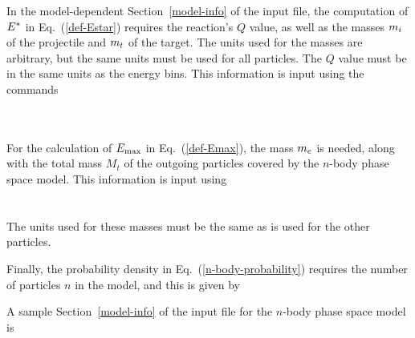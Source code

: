 In the model-dependent Section~\ref{model-info} of the input file,
the computation of ${E^*}$ in Eq.~(\ref{def-Estar}) requires the
reaction's $Q$ value, as well as the masses $m_i$ of the projectile
and $m_t$ of the target.  The units used for the masses are arbitrary,
but the same units must be used for all particles.  The $Q$ value must be
in the same units as the energy bins.  This information is input using
the commands\\
  \\
   \\
 
For the calculation of $E_{\text{max}}$ in Eq.~(\ref{def-Emax}), the mass $m_e$
is needed, along with the total mass $M_t$ of the outgoing particles covered
by the $n$-body phase space model.  This information is input using\\
  \\
 \\
The units used for these masses must be the
same as is used for the other particles.

Finally, the probability density in Eq.~(\ref{n-body-probability}) requires the number
of particles $n$ in the model, and this is given by\\
 
A sample Section~\ref{model-info} of the input file for the
$n$-body phase space model is\\
 \\
 \\
 \\
 \\
 \\
 \\


